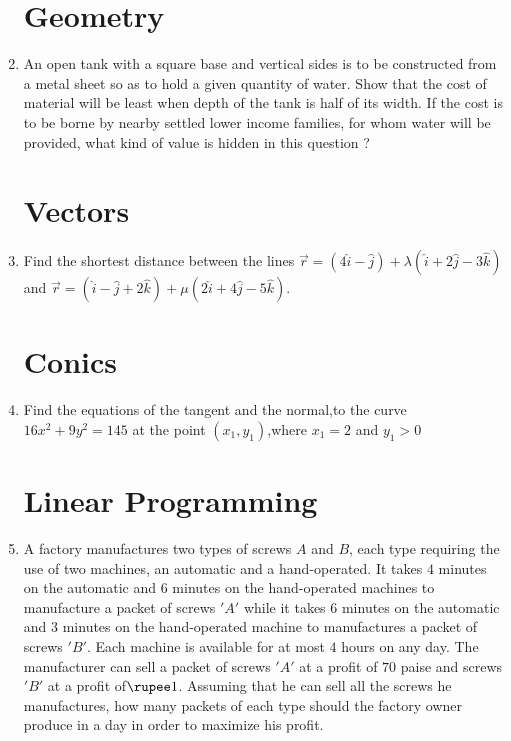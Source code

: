 \documentclass[10pt,-letter paper]{article}
\providecommand{\brak}[1]{\ensuremath{\left(#1\right)}}
\begin{document}
\begin{enumerate}
	




\section{Geometry}
\item An open tank with a square base and vertical sides is to be constructed from a metal sheet so as to hold a given quantity of water. Show that the cost of material will be least when depth of the tank is half of its width. If the cost is to be borne by nearby settled lower income families, for whom water will be provided, what kind of value is hidden in this question ?


\section{Vectors}
\item Find the shortest distance between the lines $\overrightarrow{r}=\brak{4\hat{i}-\hat{j}}+\lambda\brak{\hat{i}+2\hat{j}-3\hat{k}}$ and $\overrightarrow{r}=\brak{\hat{i}-\hat{j}+2\hat{k}}+\mu\brak{2\hat{i}+4\hat{j}-5\hat{k}}$.




\section{Conics}
\item Find the equations of the tangent and the normal,to the curve $16x^{2}+9y^{2}=145$ at the point $\brak{x_1,y_1}$,where $x_1=2$ and $y_1>0$
	








	







\section{Linear Programming}
\item A factory manufactures two types of screws $A$ and $B$, each type requiring the use of two machines, an automatic and a hand-operated. It takes $4$ minutes on the automatic and $6$ minutes on the hand-operated machines to manufacture a packet of screws $'A'$ while it takes $6$ minutes on the automatic and $3$ minutes on the hand-operated machine to manufactures a packet of screws $'B'$. Each machine is available for at most $4$ hours on any day. The manufacturer can sell a packet of screws $'A'$ at a profit of $70$ paise and screws $'B'$ at a profit of$\rupee 1$. Assuming that he can sell all the screws he manufactures, how many packets of each type should the factory owner produce in a day in order to maximize his profit.




\end{enumerate}
\end{document}
